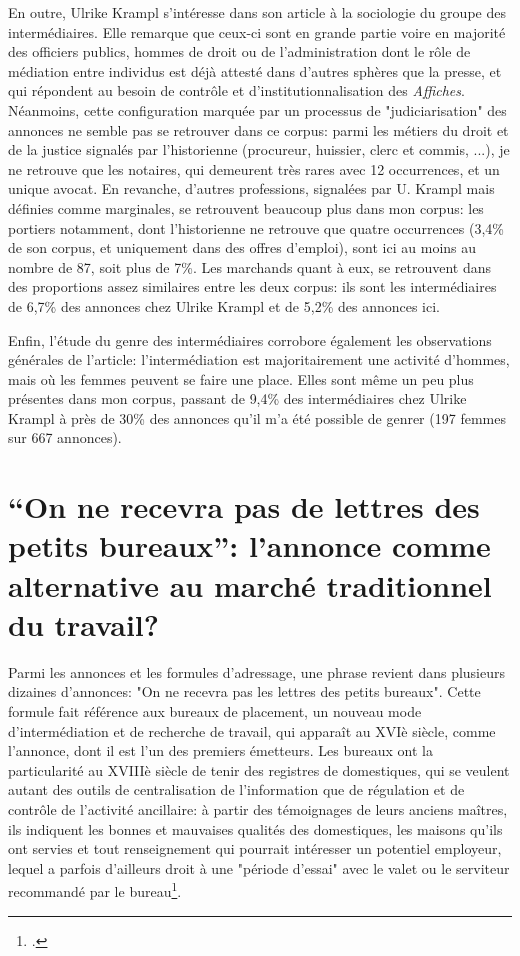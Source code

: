 En outre, Ulrike Krampl s'intéresse dans son article à la sociologie du groupe des intermédiaires. Elle remarque que ceux-ci sont en grande partie voire en majorité des officiers publics, hommes de droit ou de l'administration dont le rôle de médiation entre individus est déjà attesté dans d'autres sphères que la presse, et qui répondent au besoin de contrôle et d'institutionnalisation des \textit{Affiches}. Néanmoins, cette configuration marquée par un processus de "judiciarisation" des annonces ne semble pas se retrouver dans ce corpus: parmi les métiers du droit et de la justice signalés par l'historienne (procureur, huissier, clerc et commis, ...), je ne retrouve que les notaires, qui demeurent très rares avec 12 occurrences, et un unique avocat. En revanche, d'autres professions, signalées par U. Krampl mais définies comme marginales, se retrouvent beaucoup plus dans mon corpus: les portiers notamment, dont l'historienne ne retrouve que quatre occurrences (3,4\% de son corpus, et uniquement dans des offres d'emploi), sont ici au moins au nombre de 87, soit plus de 7\%. Les marchands quant à eux, se retrouvent dans des proportions assez similaires entre les deux corpus: ils sont les intermédiaires de 6,7\% des annonces chez Ulrike Krampl et de 5,2\% des annonces ici.

Enfin, l'étude du genre des intermédiaires corrobore également les observations générales de l'article: l'intermédiation est majoritairement une activité d'hommes, mais où les femmes peuvent se faire une place. Elles sont même un peu plus présentes dans mon corpus, passant de 9,4\% des intermédiaires chez Ulrike Krampl à près de 30\% des annonces qu'il m'a été possible de genrer (197 femmes sur 667 annonces). 


\section{“On ne recevra pas de lettres des petits bureaux”: l'annonce comme alternative au marché traditionnel du travail?}

Parmi les annonces et les formules d'adressage, une phrase revient dans plusieurs dizaines d'annonces: "On ne recevra pas les lettres des petits bureaux". Cette formule fait référence aux bureaux de placement, un nouveau mode d'intermédiation et de recherche de travail, qui apparaît au XVIè siècle, comme l'annonce, dont il est l'un des premiers émetteurs. Les bureaux ont la particularité au XVIIIè siècle de tenir des registres de domestiques, qui se veulent autant des outils de centralisation de l'information que de régulation et de contrôle de l'activité ancillaire: à partir des témoignages de leurs anciens maîtres, ils indiquent les bonnes et mauvaises qualités des domestiques, les maisons qu'ils ont servies et tout renseignement qui pourrait intéresser un potentiel employeur, lequel a parfois d'ailleurs droit à une "période d'essai" avec le valet ou le serviteur recommandé par le bureau\footcites{sabattierChapitreConditionDomestique1984}. 

